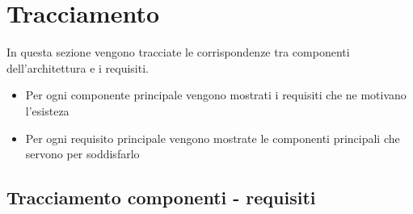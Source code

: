 \def\arraystretch{1.5}

\section{Tracciamento}
In questa sezione vengono tracciate le corrispondenze tra componenti dell'architettura e i requisiti.
\begin{itemize}
\item Per ogni componente principale vengono mostrati i requisiti che ne motivano l'esisteza
\item Per ogni requisito principale vengono mostrate le componenti principali che servono per soddisfarlo
\end{itemize}
	\subsection{Tracciamento componenti - requisiti}
